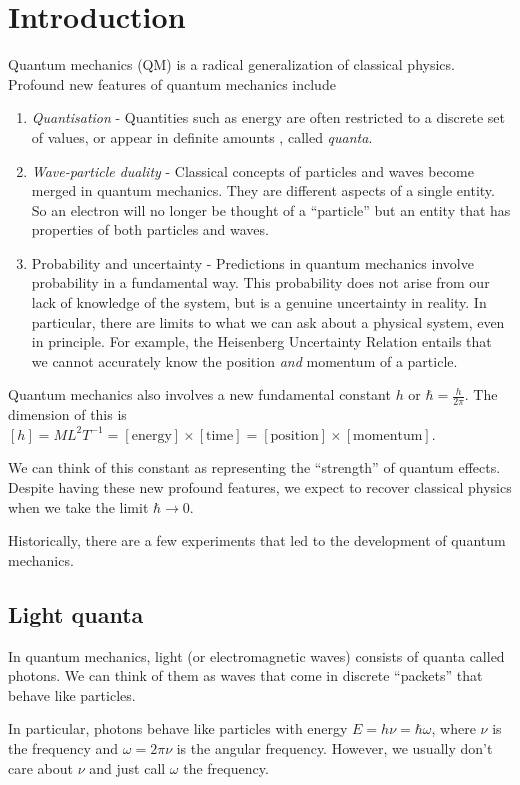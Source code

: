 \documentclass[a4paper]{article}
\begin{document}
\section{Introduction}
Quantum mechanics (QM) is a radical generalization of classical physics. Profound new features of quantum mechanics include
\begin{enumerate}
  \item \emph{Quantisation} - Quantities such as energy are often restricted to a discrete set of values, or appear in definite amounts , called \emph{quanta}.
  \item \emph{Wave-particle duality} - Classical concepts of particles and waves become merged in quantum mechanics. They are different aspects of a single entity. So an electron will no longer be thought of a ``particle'' but an entity that has properties of both particles and waves.
  \item Probability and uncertainty - Predictions in quantum mechanics involve probability in a fundamental way. This probability does not arise from our lack of knowledge of the system, but is a genuine uncertainty in reality. In particular, there are limits to what we can ask about a physical system, even in principle. For example, the Heisenberg Uncertainty Relation entails that we cannot accurately know the position \emph{and} momentum of a particle.
\end{enumerate}
Quantum mechanics also involves a new fundamental constant $h$ or $\hbar = \frac{h}{2\pi}$. The dimension of this is $[h] = ML^2T^{-1} = [\text{energy}]\times [\text{time}] = [\text{position}] \times [\text{momentum}]$.

We can think of this constant as representing the ``strength'' of quantum effects. Despite having these new profound features, we expect to recover classical physics when we take the limit $\hbar \to 0$.

Historically, there are a few experiments that led to the development of quantum mechanics.
\subsection{Light quanta}
In quantum mechanics, light (or electromagnetic waves) consists of quanta called photons. We can think of them as waves that come in discrete ``packets'' that behave like particles.

In particular, photons behave like particles with energy $E = h \nu = \hbar \omega$, where $\nu$ is the frequency and $\omega = 2\pi \nu$ is the angular frequency. However, we usually don't care about $\nu$ and just call $\omega$ the frequency.
\end{document}
